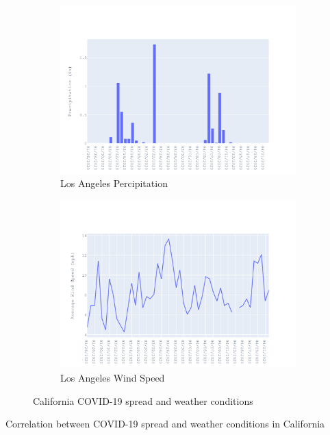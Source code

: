 \documentclass{homework}
\begin{document}
\begin{figure}[H]
  \begin{subfigure}{0.45\linewidth}
    \includegraphics[width=\linewidth]{task4/California_rain.png}
    \caption{Los Angeles Percipitation}
  \end{subfigure}
  \hfil
  \begin{subfigure}{0.45\linewidth}
    \includegraphics[width=\linewidth]{task4/California_wnd.png}
    \caption{Los Angeles Wind Speed}
  \end{subfigure}

  \caption{California COVID-19 spread and weather conditions}
  \label{fig:task4CA}
\end{figure}

\begin{table}[H]
  \caption{Correlation between COVID-19 spread and weather conditions in California}
  \label{Task 4 California}
  \centering
  
\end{table}
\end{document}
